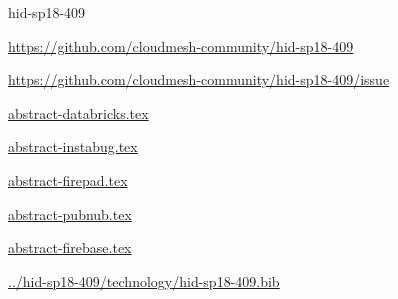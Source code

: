 \begin{IU}

hid-sp18-409

\url{https://github.com/cloudmesh-community/hid-sp18-409}

\url{https://github.com/cloudmesh-community/hid-sp18-409/issue}

\href{https://github.com/cloudmesh-community/hid-sp18-409/blob/master//technology/abstract-databricks.tex}{abstract-databricks.tex}

\href{https://github.com/cloudmesh-community/hid-sp18-409/blob/master//technology/abstract-instabug.tex}{abstract-instabug.tex}

\href{https://github.com/cloudmesh-community/hid-sp18-409/blob/master//technology/abstract-firepad.tex}{abstract-firepad.tex}

\href{https://github.com/cloudmesh-community/hid-sp18-409/blob/master//technology/abstract-pubnub.tex}{abstract-pubnub.tex}

\href{https://github.com/cloudmesh-community/hid-sp18-409/blob/master//technology/abstract-firebase.tex}{abstract-firebase.tex}

\href{https://github.com/cloudmesh-community/hid-sp18-409/blob/master//technology/hid-sp18-409.bib}{../hid-sp18-409/technology/hid-sp18-409.bib}

\end{IU}


